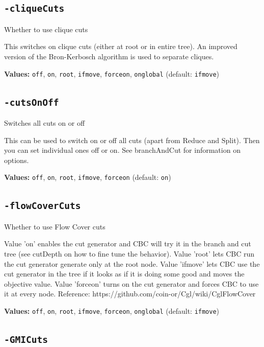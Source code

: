 \documentclass[11pt,a4paper]{article}
\begin{document}
\subsection*{\texttt{-cliqueCuts}}

Whether to use clique cuts

This switches on clique cuts (either at root or in entire tree). An improved version of the Bron-Kerbosch algorithm is used to separate cliques.

\textbf{Values:} \texttt{off}, \texttt{on}, \texttt{root}, \texttt{ifmove}, \texttt{forceon}, \texttt{onglobal} (default: \texttt{ifmove})

\subsection*{\texttt{-cutsOnOff}}

Switches all cuts on or off

This can be used to switch on or off all cuts (apart from Reduce and Split).  Then you can set individual ones off or on.  See branchAndCut for information on options.

\textbf{Values:} \texttt{off}, \texttt{on}, \texttt{root}, \texttt{ifmove}, \texttt{forceon} (default: \texttt{on})

\subsection*{\texttt{-flowCoverCuts}}

Whether to use Flow Cover cuts

Value 'on' enables the cut generator and CBC will try it in the branch and cut tree (see cutDepth on how to fine tune the behavior). Value 'root' lets CBC run the cut generator generate only at the root node. Value 'ifmove' lets CBC use the cut generator in the tree if it looks as if it is doing some good and moves the objective value. Value 'forceon' turns on the cut generator and forces CBC to use it at every node.
 Reference: https://github.com/coin-or/Cgl/wiki/CglFlowCover

\textbf{Values:} \texttt{off}, \texttt{on}, \texttt{root}, \texttt{ifmove}, \texttt{forceon}, \texttt{onglobal} (default: \texttt{ifmove})

\subsection*{\texttt{-GMICuts}}
\end{document}
